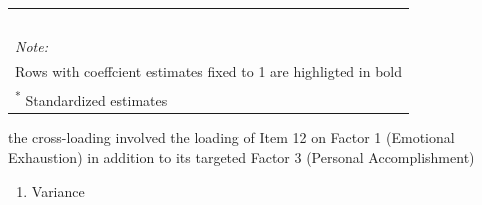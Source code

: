 \documentclass[
]{article}
\providecommand{\tightlist}{%
  \setlength{\itemsep}{0pt}\setlength{\parskip}{0pt}}
\begin{document}
\begin{table}
\begin{tabular}[t]{lrrrlrrrl}
\cellcolor[HTML]{E5E4E2}{PA→ITEM12} & \cellcolor[HTML]{E5E4E2}{0.611} & \cellcolor[HTML]{E5E4E2}{0.303} & \cellcolor[HTML]{E5E4E2}{6.214} & \cellcolor[HTML]{E5E4E2}{<0.001} & \cellcolor[HTML]{E5E4E2}{0.586} & \cellcolor[HTML]{E5E4E2}{0.283} & \cellcolor[HTML]{E5E4E2}{7.398} & \cellcolor[HTML]{E5E4E2}{<0.001}\\
\cellcolor[HTML]{E5E4E2}{PA→ITEM17} & \cellcolor[HTML]{E5E4E2}{0.681} & \cellcolor[HTML]{E5E4E2}{0.185} & \cellcolor[HTML]{E5E4E2}{7.796} & \cellcolor[HTML]{E5E4E2}{<0.001} & \cellcolor[HTML]{E5E4E2}{0.546} & \cellcolor[HTML]{E5E4E2}{0.187} & \cellcolor[HTML]{E5E4E2}{7.486} & \cellcolor[HTML]{E5E4E2}{<0.001}\\
\cellcolor[HTML]{E5E4E2}{PA→ITEM18} & \cellcolor[HTML]{E5E4E2}{0.628} & \cellcolor[HTML]{E5E4E2}{0.276} & \cellcolor[HTML]{E5E4E2}{6.628} & \cellcolor[HTML]{E5E4E2}{<0.001} & \cellcolor[HTML]{E5E4E2}{0.698} & \cellcolor[HTML]{E5E4E2}{0.294} & \cellcolor[HTML]{E5E4E2}{7.431} & \cellcolor[HTML]{E5E4E2}{<0.001}\\
\cellcolor[HTML]{E5E4E2}{PA→ITEM19} & \cellcolor[HTML]{E5E4E2}{0.643} & \cellcolor[HTML]{E5E4E2}{0.255} & \cellcolor[HTML]{E5E4E2}{6.844} & \cellcolor[HTML]{E5E4E2}{<0.001} & \cellcolor[HTML]{E5E4E2}{0.706} & \cellcolor[HTML]{E5E4E2}{0.324} & \cellcolor[HTML]{E5E4E2}{7.565} & \cellcolor[HTML]{E5E4E2}{<0.001}\\
\cellcolor[HTML]{E5E4E2}{PA→ITEM21} & \cellcolor[HTML]{E5E4E2}{0.425} & \cellcolor[HTML]{E5E4E2}{0.187} & \cellcolor[HTML]{E5E4E2}{7.018} & \cellcolor[HTML]{E5E4E2}{<0.001} & \cellcolor[HTML]{E5E4E2}{0.410} & \cellcolor[HTML]{E5E4E2}{0.242} & \cellcolor[HTML]{E5E4E2}{6.808} & \cellcolor[HTML]{E5E4E2}{<0.001}\\
\bottomrule
\multicolumn{9}{l}{\rule{0pt}{1em}\textit{Note: }}\\
\multicolumn{9}{l}{\rule{0pt}{1em}Rows with coeffcient estimates fixed to 1 are highligted in bold }\\
\multicolumn{9}{l}{\rule{0pt}{1em}\textsuperscript{*} Standardized estimates}\\
\end{tabular}
\end{table}

the cross-loading involved the loading of Item 12 on Factor 1 (Emotional Exhaustion) in addition to its targeted Factor 3 (Personal Accomplishment)

\begin{enumerate}
\def\labelenumi{(\arabic{enumi})}
\setcounter{enumi}{2}
\tightlist
\item
  Variance
\end{enumerate}
\end{document}
